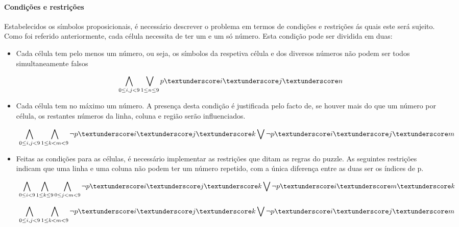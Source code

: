 \documentclass[a4paper,12pt]{article}
\begin{document}
\paragraph{Condições e restrições \newline}
Estabelecidos os símbolos proposicionais, é necessário descrever o problema em termos de condições e restrições ás quais este será sujeito.
Como foi referido anteriormente, cada célula necessita de ter um e um só número. Esta condição pode ser dividida em duas:\newline
\begin{itemize}
	\item
	Cada célula tem pelo menos um número, ou seja, os símbolos da respetiva célula e dos diversos números não podem ser todos simultaneamente falsos
	
	\begin{displaymath}
	\
	\bigwedge_{0\leq i,j < 9} \bigvee_{1\leq n \leq 9} p \textunderscore i \textunderscore j \textunderscore n
	\end{displaymath}
	
	 \item Cada célula tem no máximo um número. A presença desta condição é justificada pelo facto de, se houver mais do que um número por célula, os restantes números da linha, coluna e região serão influenciados.
	
	\begin{displaymath}
	\
	\bigwedge_{0\leq i,j < 9} \bigwedge_{1\leq k < m < 9} \lnot p \textunderscore i \textunderscore j \textunderscore k \bigvee \lnot p \textunderscore i \textunderscore j \textunderscore m
	\end{displaymath}
	
	\item Feitas as condições para as células, é necessário implementar as restrições que ditam as regras do puzzle.
	As seguintes restrições  indicam que uma linha e uma coluna não podem ter um número repetido, com a única diferença entre as duas ser os índices de p.
	
	\begin{displaymath}
	\
	\bigwedge_{0\leq i < 9} \bigwedge_{1\leq k \leq 9} \bigwedge_{0\leq j < m < 9} \lnot p \textunderscore i \textunderscore j \textunderscore k \bigvee \lnot p \textunderscore i \textunderscore m \textunderscore k
	\end{displaymath}
	
	\begin{displaymath}
	\
	\bigwedge_{0\leq i,j < 9} \bigwedge_{1\leq k < m < 9} \lnot p \textunderscore i \textunderscore j \textunderscore k \bigvee \lnot p \textunderscore i \textunderscore j \textunderscore m
	\end{displaymath}
	
	
\end{itemize}

\subsection{}
\end{document}
